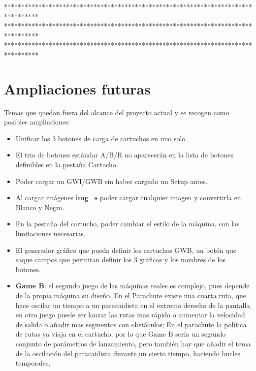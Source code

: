 **********************************************************************************\\
**********************************************************************************\\
**********************************************************************************\\

\section*{Ampliaciones futuras}
\label{sec:Ampliaciones}

Temas que quedan fuera del alcance del proyecto actual y se recogen
como posibles ampliaciones:

\begin{itemize}
	\item Unificar los 3 botones de carga de cartuchos en uno solo.
	
	\item El trio de botones estándar A/B/R no aparecerán en la lista de botones definibles en la pestaña Cartucho.
	
	\item Poder cargar un GWI/GWB sin haber cargado un Setup antes.
	
	\item Al cargar imágenes \textbf{img\_s} poder cargar cualquier imagen y convertirla en Blanco y Negro.
	
	\item En la pestaña del cartucho, poder cambiar el estilo de la máquina, con las limitaciones necesarias.
	
	\item El generador gráfico que pueda definir los cartuchos GWB, un botón que saque campos que permitan definir los 3 gráficos y los nombres de los botones.
	
	\item \textbf{Game B}: el segundo juego de las máquinas
	reales es complejo, pues depende de la propia máquina su diseño. 
	En el Parachute existe una cuarta ruta, que hace oscilar un tiempo a un paracaidista en el extremo derecho de la pantalla, en otro juego puede ser lanzar las rutas mas rápido o aumentar la velocidad de salida o añadir mas segmentos con obstáculos; En el parachute la política de rutas ya viaja en el cartucho, por lo que Game B sería un segundo conjunto
	de parámetros de lanzamiento, pero también hay que añadir el tema de la oscilación del paracaidista durante un cierto tiempo, haciendo bucles temporales.


\end{itemize}
